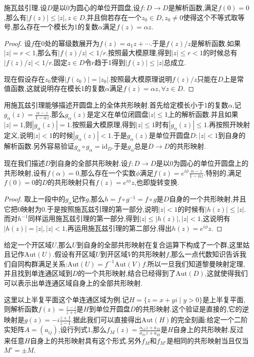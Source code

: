 施瓦兹引理.设$D$是以0为圆心的单位开圆盘,设$f:D\to D$是解析函数,满足$f(0)=0$,那么有$|f(z)|\le|z|,z\in D$,并且倘若存在一个$z_0\in D,z_0\not=0$使得这个不等式取等号,那么存在一个模长为1的复数$\alpha$满足$f(z)=\alpha z$.
\begin{proof}
	
	设$f$在$0$处的幂级数展开为$f(z)=a_1z+\cdots$.于是$f(z)/z$是解析函数.如果$|z|=r<1$,那么有$|f(z)/z|<1/r$.按照最大模原理,得到$|z|\le r<1$的时候总有$|f(z)/z|<1/r$.固定$z\in D$令$r$趋于1得到$|f(z)|\le|z|$总成立.
	
	现在假设存在$z_0$使得$|f(z_0)|=|z_0|$.按照最大模原理说明$f(z)/z$只能在$D$上是常值函数,这就说明存在模长1的复数$\alpha$满足$f(z)=\alpha z,\forall z\in D$.
\end{proof}

用施瓦兹引理能够描述开圆盘上的全体共形映射.首先给定模长小于1的复数$\alpha$,记$g_{\alpha}(z)=\frac{\alpha-z}{1-\overline{\alpha}z}$.那么$g_{\alpha}(z)$是定义在单位闭圆盘$|z|\le1$上的解析函数.并且如果$|z|=1$,则$|g_{\alpha}(z)|=1$.按照最大模原理,得到$|z|\le1$时有$|g_{\alpha}(z)|\le1$.再按照开映射定义,说明$|z|<1$的时候$|g_{\alpha}(z)|<1$.于是$g_{\alpha}(z)$是单位开圆盘$D:|z|<1$到自身的解析函数.另外容易验证$g_{\alpha}\circ g_{\alpha}=\mathrm{id}_D$.于是$g_{\alpha}$总是$D\to D$的共形映射.

现在我们描述$D$到自身的全部共形映射.设$f:D\to D$是以0为圆心的单位开圆盘上的共形映射,设有$f(\alpha)=0$,那么存在一个实数$\phi$满足$f(z)=e^{i\phi}\frac{\alpha-z}{1-\overline{\alpha}z}$.特别的,满足$f(0)=0$的$D$的共形映射只有$f(z)=e^{i\phi}z$,也即旋转变换.
\begin{proof}
	
	取上一段中的$g_{\alpha}$记作$g$,那么$h=f\circ g^{-1}=f\circ g$是$D$自身的一个共形映射,并且它把0映射为0.于是按照施瓦兹引理的第一部分,说明$|z|<1$的时候有$|h(z)|\le|z|$.而对$h^{-1}$同样运用施瓦兹引理的第一部分,得到$|z|\le|h(z)|,|z|<1$,这说明有$|h(z)|=|z|,|z|<1$,再运用施瓦兹引理的第二部分,得出$h(z)=e^{i\phi}z$.
\end{proof}

给定一个开区域$U$,那么$U$到自身的全部共形映射在复合运算下构成了一个群,这里姑且记作$\mathrm{Aut}(U)$.假设有开区域$U$到开区域$V$的共形映射$f$,那么一点代数知识告诉我们自同构群满足关系:$\mathrm{Aut}(U)=f^{-1}\mathrm{Aut}(V)f$.所以一旦我们知道黎曼映射定理,并且找到单连通区域到$D$的一个共形映射,结合已经得到了$\mathrm{Aut}(D)$,这就使得我们可以表示出单连通区域自身上的全部共形映射.

这里以上半复平面这个单连通区域为例.记$H=\{z=x+yi\mid y>0\}$是上半复平面,则解析函数$f(z)=\frac{z-i}{z+i}$是$H$到单位开圆盘$D$的共形映射.这个验证是直接的,它的逆映射是$g(z)=-i\frac{z+1}{z-1}$.据此我们可以直接得出$\mathrm{Aut}(H)$的完全刻画:给定一个二阶实矩阵$A=(a_{ij})$,设行列式1,那么$f_M(z)=\frac{a_{11}z+a_{12}}{a_{21}z+a_{22}}$是$H$自身上的共形映射.反过来任意$H$自身上的共形映射具有这个形式.另外$f_M$和$f_{M'}$是相同的共形映射当且仅当$M'=\pm M$.
\newpage
